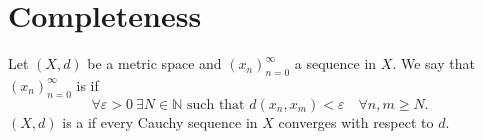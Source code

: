 
\section{Completeness}
\label{sec:completeness}

\begin{definition}
\label{def:complete_metric_space}
Let $(X,d)$ be a metric space and $(x_n)_{n=0}^{\infty}$ a sequence in $X$. We say that
$(x_n)_{n=0}^{\infty}$ is  if
\[\forall \varepsilon > 0 \ \exists N \in \mathbb{N} \text{ such that } d(x_n, x_m) < \varepsilon \quad \forall n, m \geq N.\]
$(X,d)$ is a   if
every Cauchy sequence in $X$ converges with respect to $d$.
\end{definition}

